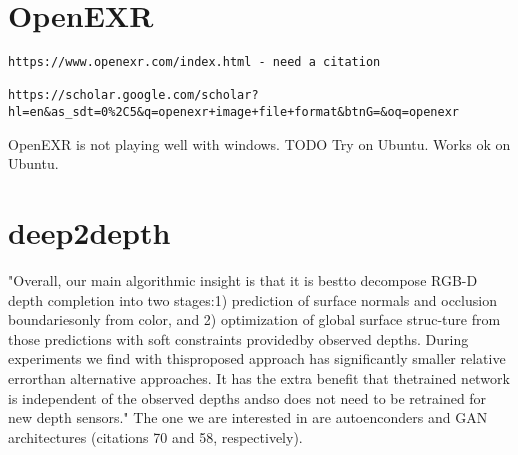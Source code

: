 \section{OpenEXR}
\begin{verbatim}
https://www.openexr.com/index.html - need a citation

https://scholar.google.com/scholar?hl=en&as_sdt=0%2C5&q=openexr+image+file+format&btnG=&oq=openexr
\end{verbatim}

OpenEXR is not playing well with windows. TODO Try on Ubuntu. Works ok on Ubuntu.

\section{deep2depth}
"Overall,  our  main  algorithmic  insight  is  that  it  is  bestto  decompose  RGB-D  depth  completion  into  two  stages:1) prediction of surface normals and occlusion boundariesonly from color, and 2) optimization of global surface struc-ture from those predictions with soft constraints providedby observed depths.  During experiments we find with thisproposed  approach  has  significantly  smaller  relative  errorthan alternative approaches. It has the extra benefit that thetrained network is independent of the observed depths andso does not need to be retrained for new depth sensors."  
The one we are interested in are autoenconders and GAN architectures (citations 70 and 58, respectively).




